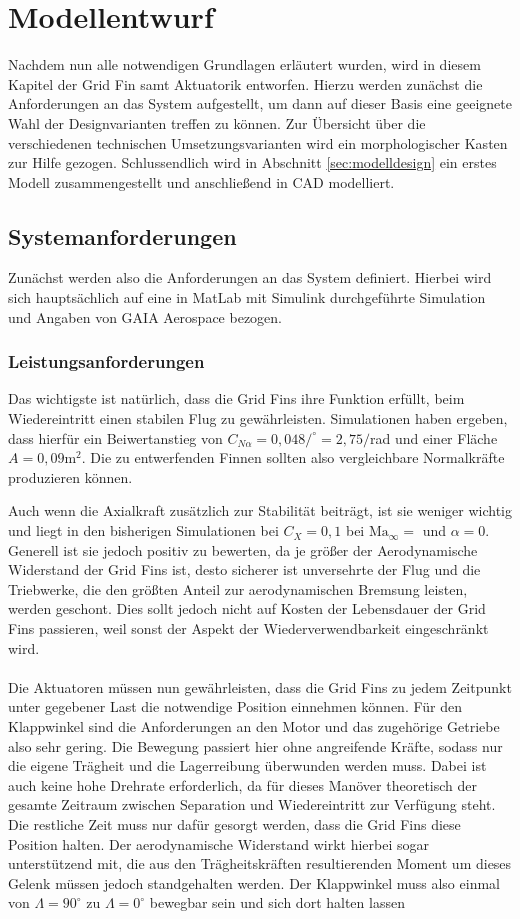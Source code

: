 \chapter{Modellentwurf}\label{sec:modellentwurf}
Nachdem nun alle notwendigen Grundlagen erläutert wurden, wird in diesem Kapitel der Grid Fin samt Aktuatorik entworfen. Hierzu werden zunächst die Anforderungen an das System aufgestellt, um dann auf dieser Basis eine geeignete Wahl der Designvarianten treffen zu können. Zur Übersicht über die verschiedenen technischen Umsetzungsvarianten wird ein morphologischer Kasten zur Hilfe gezogen. Schlussendlich wird in Abschnitt \ref{sec:modelldesign} ein erstes Modell zusammengestellt und anschließend in CAD modelliert.
\section{Systemanforderungen}
Zunächst werden also die Anforderungen an das System definiert. Hierbei wird sich hauptsächlich auf eine in MatLab mit Simulink durchgeführte Simulation und Angaben von GAIA Aerospace bezogen.
\subsection{Leistungsanforderungen}
Das wichtigste ist natürlich, dass die Grid Fins ihre Funktion erfüllt, beim Wiedereintritt einen stabilen Flug zu gewährleisten. Simulationen haben ergeben, dass hierfür ein Beiwertanstieg von $C_{N\alpha} =0,048/^\circ=2,75/$rad und einer Fläche $A=0,09\mathrm{m}^2$. Die zu entwerfenden Finnen sollten also vergleichbare Normalkräfte produzieren können.

Auch wenn die Axialkraft zusätzlich zur Stabilität beiträgt, ist sie weniger wichtig und liegt in den bisherigen Simulationen bei $C_X=0,1$ bei $\mathrm{Ma}_\infty=$ und $\alpha=0$. Generell ist sie jedoch positiv zu bewerten, da je größer der Aerodynamische Widerstand der Grid Fins ist, desto sicherer ist unversehrte der Flug und die Triebwerke, die den größten Anteil zur aerodynamischen Bremsung leisten, werden geschont. Dies sollt jedoch nicht auf Kosten der Lebensdauer der Grid Fins passieren, weil sonst der Aspekt der Wiederverwendbarkeit eingeschränkt wird.
\\~\\
Die Aktuatoren müssen nun gewährleisten, dass die Grid Fins zu jedem Zeitpunkt unter gegebener Last die notwendige Position einnehmen können. Für den Klappwinkel sind die Anforderungen an den Motor und das zugehörige Getriebe also sehr gering. Die Bewegung passiert hier ohne angreifende Kräfte, sodass nur die eigene Trägheit und die Lagerreibung überwunden werden muss. Dabei ist auch keine hohe Drehrate erforderlich, da für dieses Manöver theoretisch der gesamte Zeitraum zwischen Separation und Wiedereintritt zur Verfügung steht. Die restliche Zeit muss nur dafür gesorgt werden, dass die Grid Fins diese Position halten. Der aerodynamische Widerstand wirkt hierbei sogar unterstützend mit, die aus den Trägheitskräften resultierenden Moment um dieses Gelenk müssen jedoch standgehalten werden.
Der Klappwinkel muss also einmal von $\Lambda=90^\circ$ zu $\Lambda=0^\circ$ bewegbar sein und sich dort halten lassen

